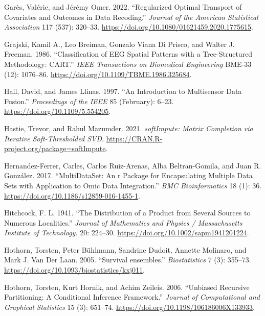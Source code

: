 \begin{CSLReferences}{1}{0}
\leavevmode{}%
Garès, Valérie, and Jérémy Omer. 2022. {``Regularized Optimal Transport of Covariates and Outcomes in Data Recoding.''} \emph{Journal of the American Statistical Association} 117 (537): 320--33. \url{https://doi.org/10.1080/01621459.2020.1775615}.

\leavevmode{}%
Grajski, Kamil A., Leo Breiman, Gonzalo Viana Di Prisco, and Walter J. Freeman. 1986. {``Classification of EEG Spatial Patterns with a Tree-Structured Methodology: CART.''} \emph{IEEE Transactions on Biomedical Engineering} BME-33 (12): 1076--86. \url{https://doi.org/10.1109/TBME.1986.325684}.

\leavevmode{}%
Hall, David, and James Llinas. 1997. {``An Introduction to Multisensor Data Fusion.''} \emph{Proceedings of the IEEE} 85 (February): 6--23. \url{https://doi.org/10.1109/5.554205}.

\leavevmode{}%
Hastie, Trevor, and Rahul Mazumder. 2021. \emph{softImpute: Matrix Completion via Iterative Soft-Thresholded SVD}. \url{https://CRAN.R-project.org/package=softImpute}.

\leavevmode{}%
Hernandez-Ferrer, Carles, Carlos Ruiz-Arenas, Alba Beltran-Gomila, and Juan R. González. 2017. {``MultiDataSet: An r Package for Encapsulating Multiple Data Sets with Application to Omic Data Integration.''} \emph{BMC Bioinformatics} 18 (1): 36. \url{https://doi.org/10.1186/s12859-016-1455-1}.

\leavevmode{}%
Hitchcock, F. L. 1941. {``The Distribution of a Product from Several Sources to Numerous Localities.''} \emph{Journal of Mathematics and Physics / Massachusetts Institute of Technology.} 20: 224--30. \url{https://doi.org/10.1002/sapm1941201224}.

\leavevmode{}%
Hothorn, Torsten, Peter Bühlmann, Sandrine Dudoit, Annette Molinaro, and Mark J. Van Der Laan. 2005. {``{Survival ensembles}.''} \emph{Biostatistics} 7 (3): 355--73. \url{https://doi.org/10.1093/biostatistics/kxj011}.

\leavevmode{}%
Hothorn, Torsten, Kurt Hornik, and Achim Zeileis. 2006. {``Unbiased Recursive Partitioning: A Conditional Inference Framework.''} \emph{Journal of Computational and Graphical Statistics} 15 (3): 651--74. \url{https://doi.org/10.1198/106186006X133933}.


\end{CSLReferences}
